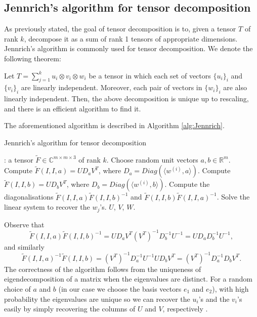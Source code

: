 \subsection{Jennrich's algorithm for tensor decomposition}
As previously stated, the goal of tensor decomposition is to, given a tensor $T$ of rank $k$, decompose it as a sum of rank 1 tensors of appropriate dimensions. Jennrich's algorithm is commonly used for tensor decomposition. We denote the following theorem:
\begin{theorem}
    Let $T=\sum_{j=1}^k u_i\otimes v_i\otimes w_i$ be a tensor in which each set of vectors $\{u_i\}_i$ and $\{v_i\}_i$ are linearly independent. Moreover, each pair of vectors in $\{w_i\}_i$ are also linearly independent. Then, the above decomposition is unique up to rescaling, and there is an efficient algorithm to find it.
\end{theorem}
The aforementioned algorithm is described in Algorithm \ref{alg:Jennrich}.
\begin{algorithm}
    \caption{Jennrich's algorithm for tensor decomposition}
    \label{alg:Jennrich}
    \begin{algorithmic}
        : a tensor $\widetilde{F}\in\mathbb{C}^{m\times m\times 3}$ of rank $k$.
        \State Choose random unit vectors $a,b\in\mathbb{R}^m$.
        \State Compute $\widetilde{F}(I,I,a)=UD_aV^T$, where $D_a=Diag(\langle w^{(i)},a\rangle)$.
        \State Compute $\widetilde{F}(I,I,b)=UD_bV^T$, where $D_b=Diag(\langle w^{(i)},b\rangle)$.
        \State Compute the diagonalisations $\widetilde{F}(I,I,a)\widetilde{F}(I,I,b)^{-1}$ and $\widetilde{F}(I,I,b)\widetilde{F}(I,I,a)^{-1}$.
        \State Solve the linear system to recover the $w_j$'s.
         $U$, $V$, $W$.
    \end{algorithmic}
\end{algorithm}\par
Observe that $$\widetilde{F}(I,I,a)\widetilde{F}(I,I,b)^{-1}=UD_aV^T(V^T)^{-1}D_b^{-1}U^{-1}=UD_aD_b^{-1}U^{-1},$$ and similarly $$\widetilde{F}(I,I,a)^{-1}\widetilde{F}(I,I,b)=(V^T)^{-1}D_a^{-1}U^{-1}UD_bV^T=(V^T)^{-1}D_a^{-1}D_bV^T.$$ The correctness of the algorithm follows from the uniqueness of eigendecomposition of a matrix when the eigenvalues are distinct. For a random choice of $a$ and $b$ (in our case we choose the basis vectors $e_1$ and $e_2$), with high probability the eigenvalues are unique so we can recover the $u_i$'s and the $v_i$'s easily by simply recovering the columns of $U$ and $V$, respectively \cite{algoToolbox}.